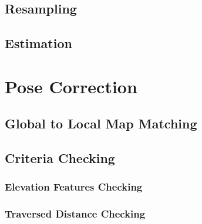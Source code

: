\subsection{Resampling}

\subsection{Estimation}

\section{Pose Correction}

\subsection{Global to Local Map Matching}

\subsection{Criteria Checking}

\subsubsection{Elevation Features Checking}

\subsubsection{Traversed Distance Checking}

